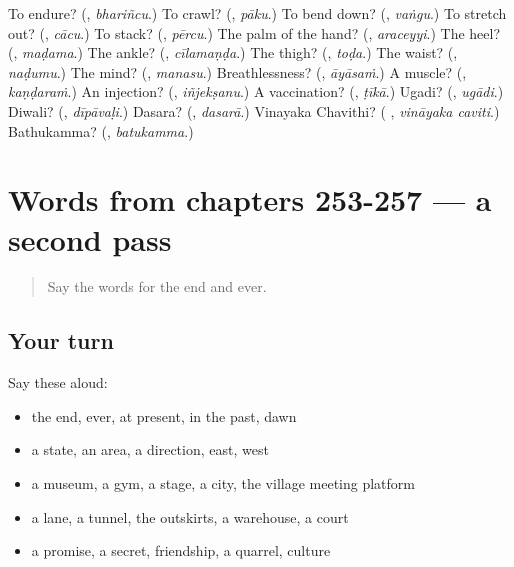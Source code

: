 \begin{tcolorbox}[breakable,colback=teal!4,colframe=teal!35!black,title={Before you move on}]
To endure? (\textbf{}, \emph{bhariñcu}.) To crawl? (\textbf{}, \emph{pāku}.) To bend down? (\textbf{}, \emph{vaṅgu}.) To stretch out? (\textbf{}, \emph{cācu}.) To stack? (\textbf{}, \emph{pērcu}.) The palm of the hand? (\textbf{}, \emph{araceyyi}.) The heel? (\textbf{}, \emph{maḍama}.) The ankle? (\textbf{}, \emph{cīlamaṇḍa}.) The thigh? (\textbf{}, \emph{toḍa}.) The waist? (\textbf{}, \emph{naḍumu}.) The mind? (\textbf{}, \emph{manasu}.) Breathlessness? (\textbf{}, \emph{āyāsaṁ}.) A muscle? (\textbf{}, \emph{kaṇḍaraṁ}.) An injection? (\textbf{}, \emph{iñjekṣanu}.) A vaccination? (\textbf{}, \emph{ṭīkā}.) Ugadi? (\textbf{}, \emph{ugādi}.) Diwali? (\textbf{}, \emph{dīpāvaḷi}.) Dasara? (\textbf{}, \emph{dasarā}.) Vinayaka Chavithi? (\textbf{ }, \emph{vināyaka caviti}.) Bathukamma? (\textbf{}, \emph{batukamma}.)
\end{tcolorbox}
\section[(dialogue)]{Words from chapters 253-257 — a second pass}

\label{lesson:TE-R257-second-pass-words-from-chapters-253-257}



\begin{quote}
Say the words for the end and ever.
\end{quote}

\subsection*{Your turn}
Say these aloud:

\begin{itemize}
\raggedright
  \item the end, ever, at present, in the past, dawn
  \item a state, an area, a direction, east, west
  \item a museum, a gym, a stage, a city, the village meeting platform
  \item a lane, a tunnel, the outskirts, a warehouse, a court
  \item a promise, a secret, friendship, a quarrel, culture
\end{itemize}

